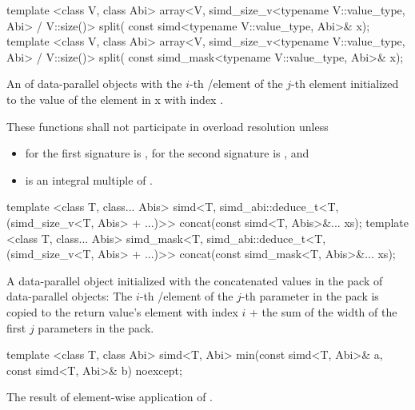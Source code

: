 \begin{itemdecl}
template <class V, class Abi>
array<V, simd_size_v<typename V::value_type, Abi> / V::size()> split(
    const simd<typename V::value_type, Abi>& x);
template <class V, class Abi>
array<V, simd_size_v<typename V::value_type, Abi> / V::size()> split(
    const simd_mask<typename V::value_type, Abi>& x);
\end{itemdecl}
\begin{itemdescr}
  \pnum\returns An  of data-parallel objects with the $i$-th \simd/\mask element of the $j$-th  element initialized to the value of the element in \code x with index .

  \pnum\remarks These functions shall not participate in overload resolution unless
  \begin{itemize}
    \item for the first signature  is \true, for the second signature  is \true, and
    \item {} is an integral multiple of .
  \end{itemize}
\end{itemdescr}

\begin{itemdecl}
template <class T, class... Abis>
simd<T, simd_abi::deduce_t<T, (simd_size_v<T, Abis> + ...)>> concat(const simd<T, Abis>&... xs);
template <class T, class... Abis>
simd_mask<T, simd_abi::deduce_t<T, (simd_size_v<T, Abis> + ...)>> concat(const simd_mask<T, Abis>&... xs);
\end{itemdecl}
\begin{itemdescr}
  \pnum\returns A data-parallel object initialized with the concatenated values in the  pack of data-parallel objects:
  The $i$-th \simd/\mask element of the $j$-th parameter in the  pack is copied to the return value's element with index $i$ + the sum of the width of the first $j$ parameters in the  pack.
\end{itemdescr}

\begin{itemdecl}
template <class T, class Abi> simd<T, Abi> min(const simd<T, Abi>& a, const simd<T, Abi>& b) noexcept;
\end{itemdecl}
\begin{itemdescr}
  \pnum\returns The result of element-wise application of  \foralli.
\end{itemdescr}

